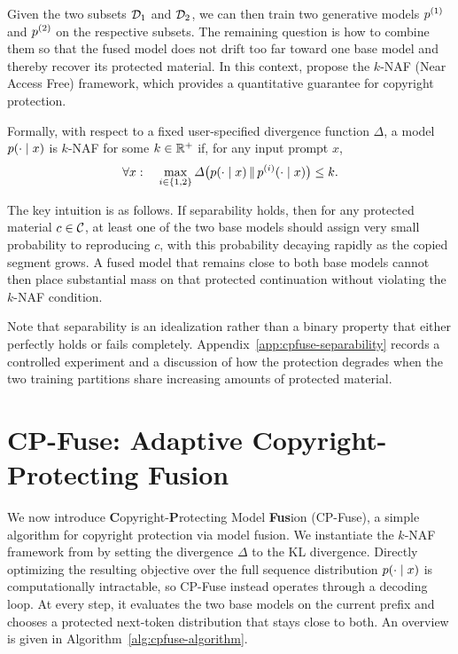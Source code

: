 Given the two subsets \(\mathcal D_1\) and \(\mathcal D_2\), we can then train two generative models \(p^{(1)}\) and \(p^{(2)}\) on the respective subsets. The remaining question is how to combine them so that the fused model does not drift too far toward one base model and thereby recover its protected material. In this context, \citet{vyas2023provable} propose the \(k\)-NAF (Near Access Free) framework, which provides a quantitative guarantee for copyright protection.

\begin{definition}
\label{def:cpfuse-knaf}
Formally, with respect to a fixed user-specified divergence function \(\Delta\), a model \(p(\cdot \mid x)\) is \(k\)-NAF for some \(k \in \mathbb{R}^+\) if, for any input prompt \(x\),
\begin{equation}
\label{eq:cpfuse-knaf}
\forall x:\quad \max_{i \in \{1,2\}} \Delta\bigl(p(\cdot \mid x)\,\|\,p^{(i)}(\cdot \mid x)\bigr) \leq k.
\end{equation}
\end{definition}

The key intuition is as follows. If separability holds, then for any protected material \(c \in \mathcal C\), at least one of the two base models should assign very small probability to reproducing \(c\), with this probability decaying rapidly as the copied segment grows. A fused model that remains close to both base models cannot then place substantial mass on that protected continuation without violating the \(k\)-NAF condition. 

Note that separability is an idealization rather than a binary property that either perfectly holds or fails completely. Appendix~\ref{app:cpfuse-separability} records a controlled experiment and a discussion of how the protection degrades when the two training partitions share increasing amounts of protected material.

\section{CP-Fuse: Adaptive Copyright-Protecting Fusion}
\label{sec:cpfuse-method}

We now introduce \textbf{C}opyright-\textbf{P}rotecting Model \textbf{Fus}ion (CP-Fuse), a simple algorithm for copyright protection via model fusion. We instantiate the \(k\)-NAF framework from  by setting the divergence \(\Delta\) to the KL divergence. Directly optimizing the resulting objective over the full sequence distribution \(p(\cdot \mid x)\) is computationally intractable, so CP-Fuse instead operates through a decoding loop. At every step, it evaluates the two base models on the current prefix and chooses a protected next-token distribution that stays close to both. An overview is given in Algorithm~\ref{alg:cpfuse-algorithm}.

